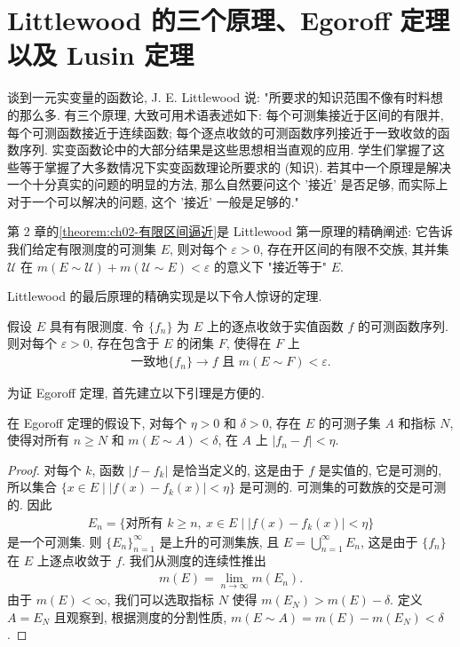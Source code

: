 \documentclass[../../main.tex]{subfiles}
\begin{document}
\section{Littlewood 的三个原理、Egoroff 定理以及 Lusin 定理}\label{section:ch03-Littlewood-Egoroff-Lusin}

谈到一元实变量的函数论, J. E. Littlewood 说: "所要求的知识范围不像有时料想的那么多. 有三个原理, 大致可用术语表述如下: 每个可测集接近于区间的有限并, 每个可测函数接近于连续函数; 每个逐点收敛的可测函数序列接近于一致收敛的函数序列. 实变函数论中的大部分结果是这些思想相当直观的应用. 学生们掌握了这些等于掌握了大多数情况下实变函数理论所要求的 (知识). 若其中一个原理是解决一个十分真实的问题的明显的方法, 那么自然要问这个 '接近' 是否足够, 而实际上对于一个可以解决的问题, 这个 '接近' 一般是足够的."

第 2 章的\cref{theorem:ch02-有限区间逼近}是 Littlewood 第一原理的精确阐述: 它告诉我们给定有限测度的可测集 $E$, 则对每个 $\varepsilon>0$, 存在开区间的有限不交族, 其并集 $\mathcal{U}$ 在 $m(E\sim\mathcal{U})+m(\mathcal{U}\sim E)<\varepsilon$ 的意义下 "接近等于" $E$.

Littlewood 的最后原理的精确实现是以下令人惊讶的定理.

\begin{theorem}[Egoroff 定理]\label{theorem:ch03-egoroff}
假设 $E$ 具有有限测度. 令 $\{f_{n}\}$ 为 $E$ 上的逐点收敛于实值函数 $f$ 的可测函数序列. 则对每个 $\varepsilon>0$, 存在包含于 $E$ 的闭集 $F$, 使得在 $F$ 上
\begin{align*}
\text{一致地}\{f_{n}\}\to f\text{ 且 }m(E\sim F)<\varepsilon.
\end{align*}
\end{theorem}

为证 Egoroff 定理, 首先建立以下引理是方便的.

\begin{lemma}\label{lemma:ch03-egoroff预备}
在 Egoroff 定理的假设下, 对每个 $\eta>0$ 和 $\delta>0$, 存在 $E$ 的可测子集 $A$ 和指标 $N$, 使得对所有 $n\geqslant N$ 和 $m(E\sim A)<\delta$, 在 $A$ 上 $|f_{n}-f|<\eta$.
\end{lemma}

\begin{proof}
对每个 $k$, 函数 $|f-f_{k}|$ 是恰当定义的, 这是由于 $f$ 是实值的, 它是可测的, 所以集合 $\{x\in E\mid|f(x)-f_{k}(x)|<\eta\}$ 是可测的. 可测集的可数族的交是可测的. 因此
\begin{align*}
E_{n}=\{\text{对所有 }k\geqslant n,\ x\in E\mid|f(x)-f_{k}(x)|<\eta\}
\end{align*}
是一个可测集. 则 $\{E_{n}\}_{n=1}^{\infty}$ 是上升的可测集族, 且 $E=\bigcup_{n=1}^{\infty}E_{n}$, 这是由于 $\{f_{n}\}$ 在 $E$ 上逐点收敛于 $f$. 我们从测度的连续性推出
\begin{align*}
m(E)=\lim_{n\to\infty}m(E_{n}).
\end{align*}
由于 $m(E)<\infty$, 我们可以选取指标 $N$ 使得 $m(E_{N})>m(E)-\delta$. 定义 $A=E_{N}$ 且观察到, 根据测度的分割性质, $m(E\sim A)=m(E)-m(E_{N})<\delta$.
\end{proof}
\end{document}
